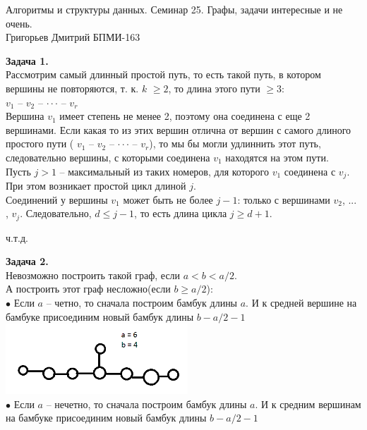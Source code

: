 \documentclass[12pt,a4paper]{scrartcl}
\begin{document}
	\begin{center}	
		Алгоритмы и структуры данных. Семинар 25.
		Графы, задачи интересные и не очень. \\
		Григорьев Дмитрий БПМИ-163\\
	\end{center}
	\textbf{Задача 1.} \\
	Рассмотрим самый длинный простой путь, то есть такой путь, в котором вершины не повторяются, т. к. $k$ $\geqslant 2$, то длина этого пути $\geqslant 3$: \\
	$v_1$ -- $v_2$ -- $\cdot \cdot \cdot$ -- $v_r$\\
	Вершина $v_1$ имеет степень не менее 2, поэтому она соединена с еще 2 вершинами. Если какая то из этих вершин отлична от вершин с самого длиного простого пути (	$v_1$ -- $v_2$ -- $\cdot \cdot \cdot$ -- $v_r$), то мы бы могли удлиннить этот путь, следовательно вершины, с которыми соединена $v_1$ находятся на этом пути.\\
	Пусть $j > 1$ -- максимальный из таких номеров, для которого $v_1$ соединена с $v_j$. При этом возникает простой цикл длиной $j$.\\
	Соединений у вершины $v_1$ может быть не более $j - 1$: только с вершинами $v_2$, ... , $v_j$. Следовательно, $d \leq j - 1$, то есть длина цикла $j \geq d + 1$.	\\
	\begin{flushright}
		ч.т.д.
	\end{flushright}
	\textbf{Задача 2.} \\
	Невозможно построить такой граф, если $a < b < a/2$.\\
	А построить этот граф несложно(если $b \geq a/2$):\\
	$\bullet$ Если $a$ -- четно, то сначала построим бамбук длины $a$. И к средней вершине на бамбуке присоединим новый бамбук длины $b - a/2 - 1$ \\
	\includegraphics[weight=100, height = 100]{ffff.png}
	\\
	$\bullet$ Если $a$ -- нечетно, то сначала построим бамбук длины $a$. И к средним вершинам на бамбуке присоединим новый бамбук длины $b - a/2 - 1$ \\
\end{document}
